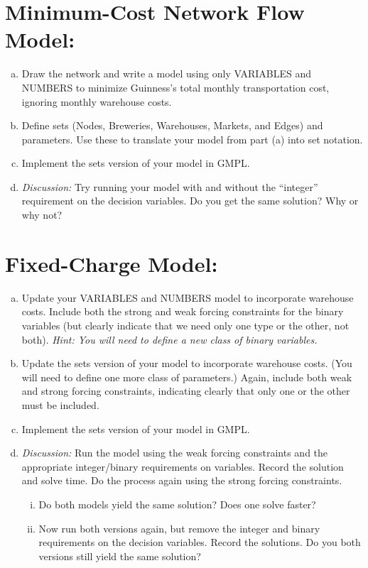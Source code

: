 \documentclass[11pt]{article}
\theoremstyle{definition}
\begin{document}
\section{Minimum-Cost Network Flow Model:}
\begin{enumerate}[a.]
\item Draw the network and write a model using only VARIABLES and NUMBERS to minimize Guinness's total monthly transportation cost, ignoring monthly warehouse costs. 
\item Define sets (Nodes, Breweries, Warehouses, Markets, and Edges) and parameters.  Use these to translate your model from part (a) into set notation.
\item Implement the sets version of your model in GMPL.  
\item \emph{Discussion:} Try running your model with and without the ``integer'' requirement on the decision variables.  Do you get the same solution?  Why or why not?
\end{enumerate}

\section{Fixed-Charge Model:}
\begin{enumerate}[a.]
\item Update your VARIABLES and NUMBERS model to incorporate warehouse costs.  Include both the strong and weak forcing constraints for the binary variables (but clearly indicate that we need only one type or the other, not both).  \emph{Hint:  You will need to define a new class of binary variables.}
\item Update the sets version of your model to incorporate warehouse costs. (You will need to define one more class of parameters.) Again, include both weak and strong forcing constraints, indicating clearly that only one or the other must be included.
\item Implement the sets version of your model in GMPL.  
\item \emph{Discussion:}  Run the model using the weak forcing constraints and the appropriate integer/binary requirements on variables.  Record the solution and solve time.  Do the process again using the strong forcing constraints.
\begin{enumerate}[(i)]
	\item Do both models yield the same solution?  Does one solve faster?
	\item Now run both versions again, but remove the integer and binary requirements on the decision variables.  Record the solutions. Do you both versions still yield the same solution?
\end{enumerate}
\end{enumerate}
		
\end{document}
